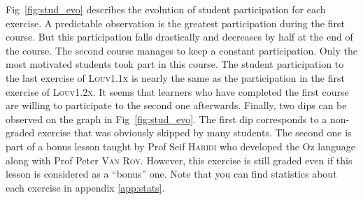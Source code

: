 \documentclass[11pt,a4paper,twoside,openright]{report}
\begin{document}
Fig~\ref{fig:stud_evo} describes the evolution of student participation for 
each exercise. A predictable observation is the greatest participation during 
the first course. But this participation falls drastically and decreases by 
half at the end of the course. The second course manages to keep a constant 
participation. Only the most motivated students took part in this course. 
The student participation to the last exercise of \textsc{Louv1.1x} 
is nearly the same as the participation in the first exercise of 
\textsc{Louv1.2x}. It seems that learners who have completed the first course 
are willing to participate to the second one afterwards. Finally, two dips can 
be observed on the graph in Fig~\ref{fig:stud_evo}. The first dip corresponds to a non-graded exercise 
that was obviously skipped by many students. The second one is part of a bonus 
lesson taught by Prof Seif \textsc{Haridi} who developed the Oz language 
along with Prof Peter \textsc{Van Roy}. However, this exercise is still graded 
even if this lesson is considered as a \enquote{bonus} one. Note that you can
find statistics about each exercise in appendix \ref{app:stats}.\\
\end{document}
